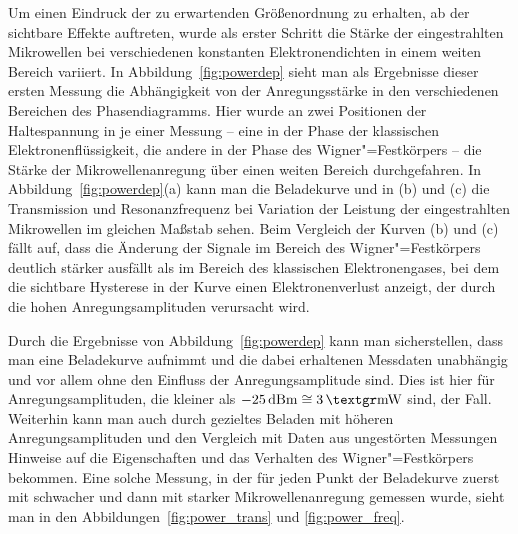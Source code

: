 Um einen Eindruck der zu erwartenden Größenordnung zu erhalten, ab der sichtbare Effekte auftreten, wurde als erster Schritt die Stärke der eingestrahlten Mikrowellen bei verschiedenen konstanten Elektronendichten in einem weiten Bereich variiert. In Abbildung~\ref{fig:powerdep} sieht man als Ergebnisse dieser ersten Messung die Abhängigkeit von der Anregungsstärke in den verschiedenen Bereichen des Phasendiagramms. Hier wurde an zwei Positionen der Haltespannung in je einer Messung -- eine in der Phase der klassischen Elektronenflüssigkeit, die andere in der Phase des Wigner"=Festkörpers -- die Stärke der Mikrowellenanregung über einen weiten Bereich durchgefahren. In Abbildung~\ref{fig:powerdep}(a) kann man die Beladekurve und in (b) und (c) die Transmission und Resonanzfrequenz bei Variation der Leistung der eingestrahlten Mikrowellen im gleichen Maßstab sehen. Beim Vergleich der Kurven (b) und (c) fällt auf, dass die Änderung der Signale im Bereich des Wigner"=Festkörpers deutlich stärker ausfällt als im Bereich des klassischen Elektronengases, bei dem die sichtbare Hysterese in der Kurve einen Elektronenverlust anzeigt, der durch die hohen Anregungsamplituden verursacht wird. 

Durch die Ergebnisse von Abbildung~\ref{fig:powerdep} kann man sicherstellen, dass man eine Beladekurve aufnimmt und die dabei erhaltenen Messdaten unabhängig und vor allem ohne den Einfluss der Anregungsamplitude sind. Dies ist hier für Anregungsamplituden, die kleiner als $\unit[-25]{dBm}\cong\unit[3]{\grmu W}$ sind, der Fall. Weiterhin kann man auch durch gezieltes Beladen mit höheren Anregungsamplituden und den Vergleich mit Daten aus ungestörten Messungen Hinweise auf die Eigenschaften und das Verhalten des Wigner"=Festkörpers bekommen. Eine solche Messung, in der für jeden Punkt der Beladekurve zuerst mit schwacher und dann mit starker Mikrowellenanregung gemessen wurde, sieht man in den Abbildungen~\ref{fig:power_trans} und \ref{fig:power_freq}.

     
